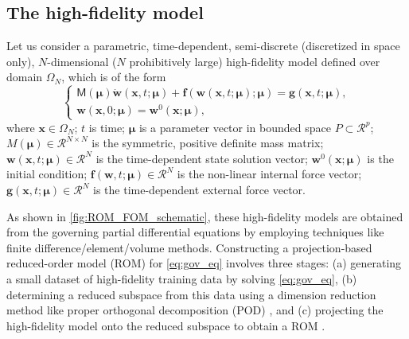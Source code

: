 \documentclass[11pt]{article}
\renewcommand{\vec}[1]{\mathbf{#1}}
\newcommand{\mat}[1]{\mathsf{#1}}
\begin{document}
\subsection{The high-fidelity model}

Let us consider a parametric, time-dependent, semi-discrete (discretized in space only), $N$-dimensional ($N$ prohibitively large) high-fidelity model defined over domain $\Omega_N$, which is of the form \cite{benner_2021}
\begin{equation}
\left\{
\begin{array}{l}
\mat{M}(\boldsymbol{\mu})\dot{\vec{w}}(\vec{x},t; \boldsymbol{\mu}) + \vec{f}(\vec{w}(\vec{x},t; \boldsymbol{\mu}); \boldsymbol{\mu}) = \vec{g}(\vec{x},t; \boldsymbol{\mu}),\\
\vec{w}(\vec{x},0; \boldsymbol{\mu}) = \vec{w}^0(\vec{x};\boldsymbol{\mu}),
\end{array}
\right.
\label{eq:gov_eq}
\end{equation}
where $\vec{x}\in\Omega_N$; $t$ is time; $\boldsymbol{\mu}$ is a parameter vector in bounded space $P \subset \mathcal{R}^p$; $M(\boldsymbol{\mu}) \in \mathcal{R}^{N \times N}$ is the symmetric, positive definite mass matrix; $\vec{w}(\vec{x},t; \boldsymbol{\mu}) \in \mathcal{R}^{N}$ is the time-dependent state solution vector; $\vec{w}^0(\vec{x};\boldsymbol{\mu})$ is the initial condition; $\vec{f}(\vec{w}, t; \boldsymbol{\mu}) \in \mathcal{R}^{N}$ is the non-linear internal force vector; $\vec{g}(\vec{x},t; \boldsymbol{\mu}) \in \mathcal{R}^{N}$ is the time-dependent external force vector.

As shown in \cref{fig:ROM_FOM_schematic}, these high-fidelity models are obtained from the governing partial differential equations by employing techniques like finite difference/element/volume methods.
Constructing a projection-based reduced-order model (ROM) for \cref{eq:gov_eq} involves three stages: (a) generating a small dataset of high-fidelity training data by solving \cref{eq:gov_eq}, (b) determining a reduced subspace from this data using a dimension reduction method like proper orthogonal decomposition (POD) \cite{holmes1996turbulence}, and (c) projecting the high-fidelity model onto the reduced subspace to obtain a ROM \cite{benner2015survey}.
\end{document}
